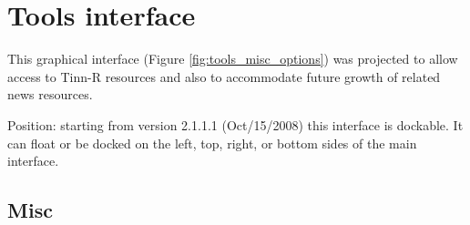 
\hypertarget{working_tools}{}
\section{Tools interface}

This graphical interface
(Figure \ref{fig:tools_misc_options})
was projected to allow access to Tinn-R resources
and also to accommodate future growth of related news resources.

Position: starting from version 2.1.1.1 (Oct/15/2008) this interface is
dockable. It can float or be docked on the left, top, right, or bottom
sides of the main interface.


\hypertarget{working_tools_misc}{}
\subsection{Misc}

